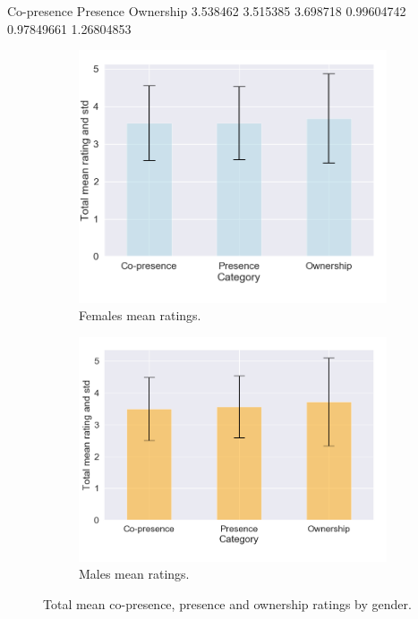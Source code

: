 Co-presence   Presence       Ownership
3.538462         3.515385       3.698718
0.99604742    0.97849661    1.26804853


\begin{figure}[H]
\begin{subfigure}[b]{0.5\textwidth}
 \centering
 \includegraphics[scale=0.4]{Files/Plots/misc_all_mean_f.png}
 \caption{Females mean ratings. }
 \label{fig:miscAllFemales}
 \end{subfigure}
\begin{subfigure}[b]{0.5\textwidth}
 \centering
 \includegraphics[scale=0.4]{Files/Plots/misc_all_mean_m.png}
 \caption{Males mean ratings.}
 \label{fig:miscAllMales}
 \end{subfigure}
 \caption{Total mean co-presence, presence and ownership ratings by gender. }
\label{fig:miscAllGendered}
\end{figure}

